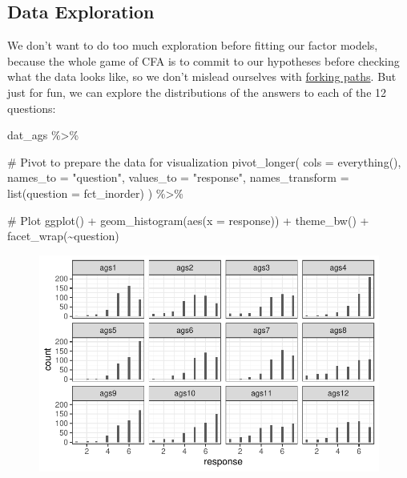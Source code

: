 \documentclass[
  letterpaper,
  DIV=11,
  numbers=noendperiod]{scrreprt}
\newenvironment{Shaded}{\begin{snugshade}}{\end{snugshade}}
\newcommand{\AttributeTok}[1]{\textcolor[rgb]{0.40,0.45,0.13}{#1}}
\newcommand{\CommentTok}[1]{\textcolor[rgb]{0.37,0.37,0.37}{#1}}
\newcommand{\FunctionTok}[1]{\textcolor[rgb]{0.28,0.35,0.67}{#1}}
\newcommand{\NormalTok}[1]{\textcolor[rgb]{0.00,0.23,0.31}{#1}}
\newcommand{\SpecialCharTok}[1]{\textcolor[rgb]{0.37,0.37,0.37}{#1}}
\newcommand{\StringTok}[1]{\textcolor[rgb]{0.13,0.47,0.30}{#1}}
\begin{document}
\hypertarget{data-exploration}{%
\subsection*{Data Exploration}\label{data-exploration}}

We don't want to do too much exploration before fitting our factor
models, because the whole game of CFA is to commit to our hypotheses
before checking what the data looks like, so we don't mislead ourselves
with
\href{http://www.stat.columbia.edu/~gelman/research/unpublished/p_hacking.pdf}{forking
paths}. But just for fun, we can explore the distributions of the
answers to each of the 12 questions:

\begin{Shaded}
\begin{Highlighting}[]
\NormalTok{dat\_ags }\SpecialCharTok{\%\textgreater{}\%} 

  \CommentTok{\# Pivot to prepare the data for visualization}
  \FunctionTok{pivot\_longer}\NormalTok{(}
    \AttributeTok{cols      =} \FunctionTok{everything}\NormalTok{(),}
    \AttributeTok{names\_to  =} \StringTok{"question"}\NormalTok{,}
    \AttributeTok{values\_to =} \StringTok{"response"}\NormalTok{,}
    \AttributeTok{names\_transform =} \FunctionTok{list}\NormalTok{(}\AttributeTok{question =}\NormalTok{ fct\_inorder)  }
\NormalTok{  ) }\SpecialCharTok{\%\textgreater{}\%} 

  \CommentTok{\# Plot}
  \FunctionTok{ggplot}\NormalTok{() }\SpecialCharTok{+}
  \FunctionTok{geom\_histogram}\NormalTok{(}\FunctionTok{aes}\NormalTok{(}\AttributeTok{x =}\NormalTok{ response)) }\SpecialCharTok{+} 
  \FunctionTok{theme\_bw}\NormalTok{() }\SpecialCharTok{+} 
  \FunctionTok{facet\_wrap}\NormalTok{(}\SpecialCharTok{\textasciitilde{}}\NormalTok{question)}
\end{Highlighting}
\end{Shaded}

\begin{figure}[H]

{\centering \includegraphics{./traditional-cfa-workflow_files/figure-pdf/unnamed-chunk-3-1.pdf}

}

\end{figure}
\end{document}
